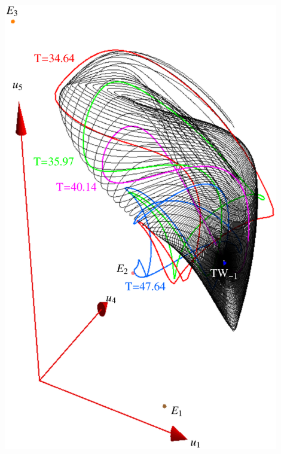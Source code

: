 \documentclass{beamer}
\begin{document}
\begin{frame}[t]
\begin{columns}
	\includegraphics[width=0.9\textwidth, height=0.95\textheight,clip=true]{../../figs/ks22tw1umInv}

\end{columns}
\end{frame}
\end{document}
